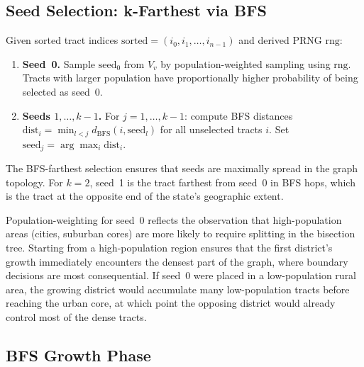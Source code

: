 \subsection{Seed Selection: k-Farthest via BFS}

\begin{definition}
\label{def:seeds}
Given sorted tract indices $\mathrm{sorted} = (i_0, i_1, \ldots, i_{n-1})$
and derived PRNG $\mathrm{rng}$:
\begin{enumerate}
\item \textbf{Seed~0.} Sample $\mathrm{seed}_0$ from $V_v$ by
  population-weighted sampling using $\mathrm{rng}$.
  Tracts with larger population have proportionally higher probability
  of being selected as seed~0.

\item \textbf{Seeds $1, \ldots, k-1$.} For $j = 1, \ldots, k-1$:
  compute BFS distances $\mathrm{dist}_i = \min_{l < j} d_{\mathrm{BFS}}(i, \mathrm{seed}_l)$
  for all unselected tracts $i$.
  Set $\mathrm{seed}_j = \arg\max_i \mathrm{dist}_i$.
\end{enumerate}
\end{definition}

The BFS-farthest selection ensures that seeds are maximally spread in
the graph topology.
For $k = 2$, seed~1 is the tract farthest from seed~0 in BFS hops,
which is the tract at the opposite end of the state's geographic extent.

\begin{remark}
Population-weighting for seed~0 reflects the observation that
high-population areas (cities, suburban cores) are more likely to
require splitting in the bisection tree.
Starting from a high-population region ensures that the first district's
growth immediately encounters the densest part of the graph, where
boundary decisions are most consequential.
If seed~0 were placed in a low-population rural area, the growing district
would accumulate many low-population tracts before reaching the urban
core, at which point the opposing district would already control most of
the dense tracts.
\end{remark}

\subsection{BFS Growth Phase}


